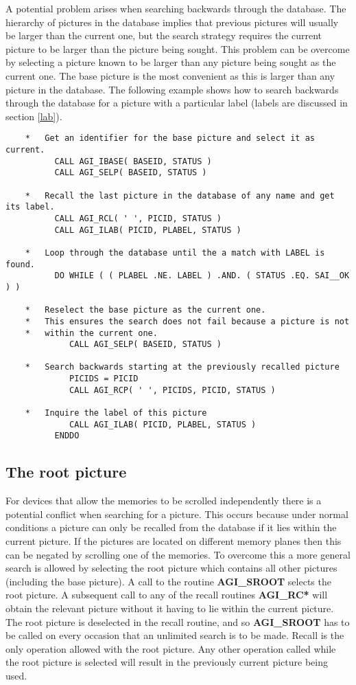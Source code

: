 A potential problem arises when searching backwards through the database.
The hierarchy of pictures in the database implies that previous pictures
will usually be larger than the current one, but the search strategy
requires the current picture to be larger than the picture being sought.
This problem can be overcome by selecting a picture known to be larger
than any picture being sought as the current one. The base picture is
the most convenient as this is larger than any picture in the database.
The following example shows how to search backwards through the database
for a picture with a particular label (labels are discussed in section
\ref{lab}).
\begin{verbatim}
    *   Get an identifier for the base picture and select it as current.
          CALL AGI_IBASE( BASEID, STATUS )
          CALL AGI_SELP( BASEID, STATUS )

    *   Recall the last picture in the database of any name and get its label.
          CALL AGI_RCL( ' ', PICID, STATUS )
          CALL AGI_ILAB( PICID, PLABEL, STATUS )

    *   Loop through the database until the a match with LABEL is found.
          DO WHILE ( ( PLABEL .NE. LABEL ) .AND. ( STATUS .EQ. SAI__OK ) )

    *   Reselect the base picture as the current one.
    *   This ensures the search does not fail because a picture is not
    *   within the current one.
             CALL AGI_SELP( BASEID, STATUS )

    *   Search backwards starting at the previously recalled picture
             PICIDS = PICID
             CALL AGI_RCP( ' ', PICIDS, PICID, STATUS )

    *   Inquire the label of this picture
             CALL AGI_ILAB( PICID, PLABEL, STATUS )
          ENDDO
\end{verbatim}

\subsection{The root picture}
For devices that allow the memories to be scrolled independently there is
a potential conflict when searching for a picture. This occurs because
under normal conditions a picture can only be recalled from the database
if it lies within the current picture. If the pictures are located on
different memory planes then this can be negated by scrolling one of the
memories. To overcome this a more general search is allowed by selecting
the root picture which contains all other pictures (including the base
picture). A call to the routine {\bf AGI\_SROOT} selects the root
picture. A subsequent call to any of the recall routines {\bf AGI\_RC*}
will obtain the relevant picture without it having to lie within the
current picture. The root picture is deselected in the recall routine, and
so {\bf AGI\_SROOT} has to be called on every occasion that an unlimited
search is to be made. Recall is the only operation allowed with the root
picture. Any other operation called while the root picture is selected
will result in the previously current picture being used.

